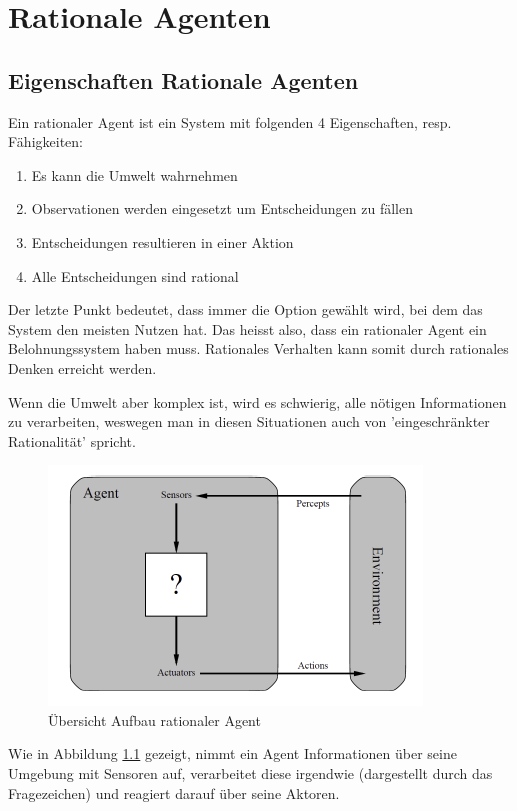 \chapter{Rationale Agenten}
\section{Eigenschaften Rationale Agenten}
Ein rationaler Agent ist ein System mit folgenden 4 Eigenschaften, resp. Fähigkeiten:
\begin{enumerate}
	\item Es kann die Umwelt wahrnehmen
	\item Observationen werden eingesetzt um Entscheidungen zu fällen
	\item Entscheidungen resultieren in einer Aktion
	\item Alle Entscheidungen sind rational
\end{enumerate}

Der letzte Punkt bedeutet, dass immer die Option gewählt wird, bei dem das System den meisten Nutzen hat. Das heisst also, dass ein rationaler Agent ein Belohnungssystem haben muss. Rationales Verhalten kann somit durch rationales Denken erreicht werden.

Wenn die Umwelt aber komplex ist, wird es schwierig, alle nötigen Informationen zu verarbeiten, weswegen man in diesen Situationen auch von 'eingeschränkter Rationalität' spricht.

\begin{figure}[h]
\centering
\includegraphics[width=0.7\linewidth]{fig/rationaler_agent}
\caption{Übersicht Aufbau rationaler Agent}
\label{fig:rationaler_agent}
\end{figure}

Wie in Abbildung \ref{fig:rationaler_agent} gezeigt, nimmt ein Agent Informationen über seine Umgebung mit Sensoren auf, verarbeitet diese irgendwie (dargestellt  durch das Fragezeichen) und reagiert darauf über seine Aktoren.

